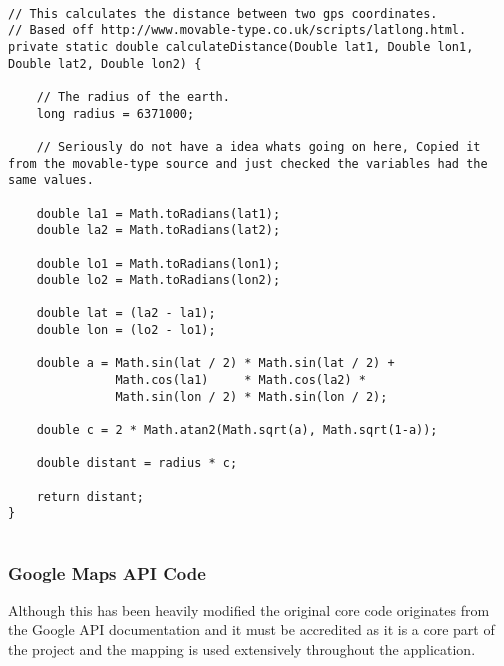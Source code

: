 \begin{lstlisting}

// This calculates the distance between two gps coordinates.
// Based off http://www.movable-type.co.uk/scripts/latlong.html.
private static double calculateDistance(Double lat1, Double lon1, Double lat2, Double lon2) {

    // The radius of the earth.
    long radius = 6371000;

    // Seriously do not have a idea whats going on here, Copied it from the movable-type source and just checked the variables had the same values.

    double la1 = Math.toRadians(lat1);
    double la2 = Math.toRadians(lat2);

    double lo1 = Math.toRadians(lon1);
    double lo2 = Math.toRadians(lon2);

    double lat = (la2 - la1);
    double lon = (lo2 - lo1);

    double a = Math.sin(lat / 2) * Math.sin(lat / 2) +
               Math.cos(la1)     * Math.cos(la2) *
               Math.sin(lon / 2) * Math.sin(lon / 2);

    double c = 2 * Math.atan2(Math.sqrt(a), Math.sqrt(1-a));

    double distant = radius * c;

    return distant;
}
 
\end{lstlisting}


\subsubsection{Google Maps API Code}

Although this has been heavily modified the original core code originates from the Google API documentation and it must be accredited as it is a core part of the project and the mapping is used extensively throughout the application.

